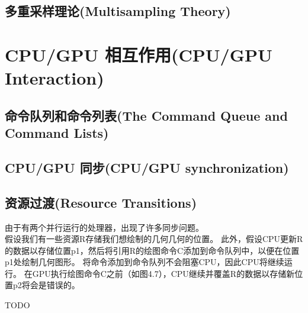 \documentclass[11pt,a4paper,oldfontcommands]{memoir}
\begin{document}
{\subsection{多重采样理论(Multisampling Theory)}

\section{CPU/GPU 相互作用(CPU/GPU Interaction)}
\subsection{命令队列和命令列表(The Command Queue and Command Lists)}
\subsection{CPU/GPU 同步(CPU/GPU synchronization)}
\subsection{资源过渡(Resource Transitions)}
\begin{flushleft}
由于有两个并行运行的处理器，出现了许多同步问题。\\
假设我们有一些资源R存储我们想绘制的几何几何的位置。 此外，假设CPU更新R的数据以存储位置p1，然后将引用R的绘图命令C添加到命令队列中，以便在位置p1处绘制几何图形。 将命令添加到命令队列不会阻塞CPU，因此CPU将继续运行。 在GPU执行绘图命令C之前（如图4.7），CPU继续并覆盖R的数据以存储新位置p2将会是错误的。
\end{flushleft}
TODO
}
\end{document}
